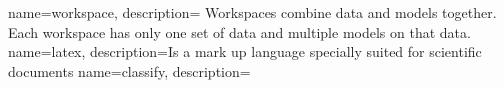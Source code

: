 {
    name={workspace},
    description={%
        Workspaces combine data and models together. Each workspace has only one set of data and multiple models on that data.
    }
}
{
    name={latex},
    description={Is a mark up language specially suited for scientific documents}
}
{
    name={classify},
    description={}
}
